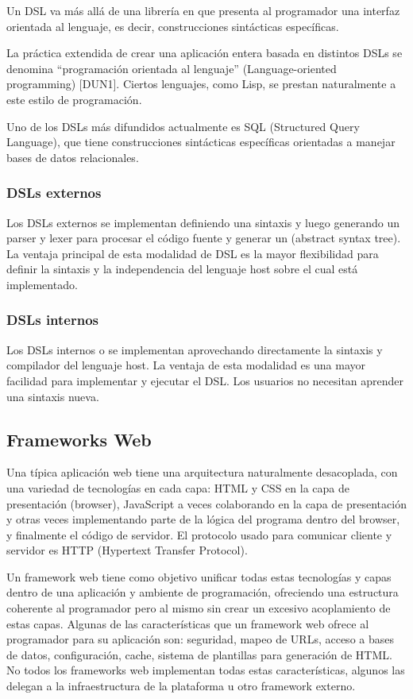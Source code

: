\documentclass[12pt]{article}
\begin{document}
Un DSL va más allá de una librería en que presenta al programador una interfaz orientada al lenguaje, es decir, construcciones sintácticas específicas.

La práctica extendida de crear una aplicación entera basada en distintos DSLs se denomina “programación orientada al lenguaje” (Language-oriented programming) [DUN1]. Ciertos lenguajes, como Lisp, se prestan naturalmente a este estilo de programación.

Uno de los DSLs más difundidos actualmente es SQL (Structured Query Language), que tiene construcciones sintácticas específicas orientadas a manejar bases de datos relacionales.

\subsubsection{DSLs externos}

Los DSLs externos se implementan definiendo una sintaxis y luego generando un parser y lexer para procesar el código fuente y generar un  (abstract syntax tree). La ventaja principal de esta modalidad de DSL es la mayor flexibilidad para definir la sintaxis y la independencia del lenguaje host sobre el cual está implementado.

\subsubsection{DSLs internos}

Los DSLs internos o  se implementan aprovechando directamente la sintaxis y compilador del lenguaje host. La ventaja de esta modalidad es una mayor facilidad para implementar y ejecutar el DSL. Los usuarios no necesitan aprender una sintaxis nueva.

\subsection{Frameworks Web}

Una típica aplicación web tiene una arquitectura naturalmente desacoplada, con una variedad de tecnologías en cada capa: HTML y CSS en la capa de presentación (browser), JavaScript a veces colaborando en la capa de presentación y otras veces implementando parte de la lógica del programa dentro del browser, y finalmente el código de servidor. El protocolo usado para comunicar cliente y servidor es HTTP (Hypertext Transfer Protocol).

Un framework web tiene como objetivo unificar todas estas tecnologías y capas dentro de una aplicación y ambiente de programación, ofreciendo una estructura coherente al programador pero al mismo sin crear un excesivo acoplamiento de estas capas. Algunas de las características que un framework web ofrece al programador para su aplicación son: seguridad, mapeo de URLs, acceso a bases de datos, configuración, cache, sistema de plantillas para generación de HTML. No todos los frameworks web implementan todas estas características, algunos las delegan a la infraestructura de la plataforma u otro framework externo.
\end{document}
